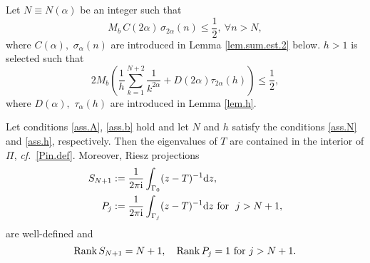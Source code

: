 Let $N\equiv N(\alpha)$ be an integer such that
\begin{equation}\label{ass.N}
M_b \, C(2\alpha) \, \sigma_{2\alpha}(n) \leq  \frac{1}{2}, \ \forall n>N,
\end{equation}
where $C(\alpha),$ $\sigma_{\alpha}(n)$ are introduced in Lemma \ref{lem.sum.est.2} below. $h>1$ is selected such that 
\begin{equation}\label{ass.h}
2 M_b 
\left(
\frac{1}{h}\sum_{k=1}^{N+2} \frac{1}{k^{2\alpha} } 
+
D(2\alpha) \tau_{2\alpha}(h)
\right)
\leq \frac{1}{2},
\end{equation}
where $D(\alpha),$ $\tau_{\alpha}(h)$ are introduced in Lemma \ref{lem.h}.

\begin{proposition}\label{prop.loc}
Let conditions \eqref{ass.A}, \eqref{ass.b} hold and let $N$ and $h$ satisfy the conditions \eqref{ass.N} and \eqref{ass.h}, respectively. Then the eigenvalues of $T$ are contained in the interior of $\Pi$, {\emph{cf.}}~\eqref{Pin.def}. Moreover, Riesz projections 
\begin{equation}\label{Pn.SN.def}
\begin{aligned}
S_{N+1}&:=\frac{1}{2\pi {{\rm i}}} \int_{\Gamma_0}(z-T)^{-1} {{{\rm d}}} z, \\
P_j & := \frac{1}{2\pi {{\rm i}}} \int_{\Gamma_j}(z-T)^{-1} {{{\rm d}}} z \ {\rm for} \ \ j>N+1,
\end{aligned}
\end{equation}
are well-defined and 
\begin{equation*}
{\rm Rank} \, S_{N+1} =  N+1, \quad {\rm Rank} \, P_{j} =1 \ {\rm for } \ j>N+1.
\end{equation*}

\end{proposition}
